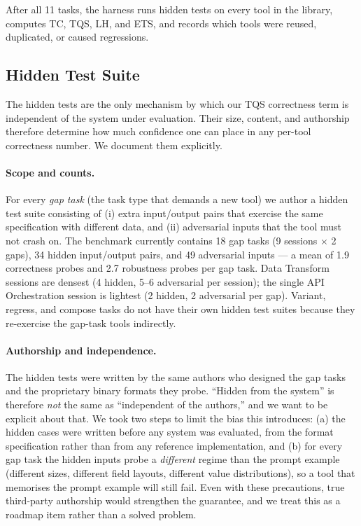 \documentclass[sigplan,nonacm,natbib=false]{acmart}
\begin{document}
After all 11 tasks, the harness runs hidden tests on every tool in the library, computes TC, TQS, LH, and ETS, and records which tools were reused, duplicated, or caused regressions.

\subsection{Hidden Test Suite}
\label{sec:hidden_tests}

The hidden tests are the only mechanism by which our TQS correctness term is independent of the system under evaluation. Their size, content, and authorship therefore determine how much confidence one can place in any per-tool correctness number. We document them explicitly.

\paragraph{Scope and counts.} For every \emph{gap task} (the task type that demands a new tool) we author a hidden test suite consisting of (i) extra input/output pairs that exercise the same specification with different data, and (ii) adversarial inputs that the tool must not crash on. The benchmark currently contains 18 gap tasks (9 sessions $\times$ 2 gaps), 34 hidden input/output pairs, and 49 adversarial inputs --- a mean of 1.9 correctness probes and 2.7 robustness probes per gap task. Data Transform sessions are densest (4 hidden, 5--6 adversarial per session); the single API Orchestration session is lightest (2 hidden, 2 adversarial per gap). Variant, regress, and compose tasks do not have their own hidden test suites because they re-exercise the gap-task tools indirectly.

\paragraph{Authorship and independence.} The hidden tests were written by the same authors who designed the gap tasks and the proprietary binary formats they probe. ``Hidden from the system'' is therefore \emph{not} the same as ``independent of the authors,'' and we want to be explicit about that. We took two steps to limit the bias this introduces: (a) the hidden cases were written before any system was evaluated, from the format specification rather than from any reference implementation, and (b) for every gap task the hidden inputs probe a \emph{different} regime than the prompt example (different sizes, different field layouts, different value distributions), so a tool that memorises the prompt example will still fail. Even with these precautions, true third-party authorship would strengthen the guarantee, and we treat this as a roadmap item rather than a solved problem.
\end{document}
